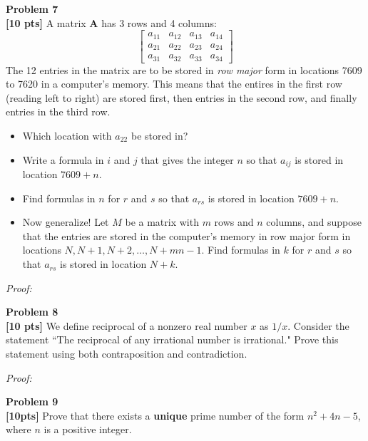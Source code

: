 \documentclass{article}
\newenvironment{problem}[2][Problem]
    { \begin{mdframed}[backgroundcolor=gray!20] \textbf{#1 #2} \\}
    {  \end{mdframed}}
\newenvironment{solution}
    {\textit{Proof:}}
    {}
\begin{document}
\begin{problem}{7}
\textbf{[10 pts]} A matrix $\textbf{A}$ has 3 rows and 4 columns:
\[
    \begin{bmatrix} 
        a_{11} & a_{12} & a_{13} & a_{14} \\
        a_{21} & a_{22} & a_{23} & a_{24} \\
        a_{31} & a_{32} & a_{33} & a_{34} 
    \end{bmatrix}
\]
The 12 entries in the matrix are to be stored in \textit{row major} form in locations 7609 to 7620 in a computer's memory. This means that the entires in the first row (reading left to right) are stored first, then entries in the second row, and finally entries in the third row.
\begin{itemize}
    \item Which location with $a_{22}$ be stored in?
    \item Write a formula in $i$ and $j$ that gives the integer $n$ so that $a_{ij}$ is stored in location $7609 + n$. 
    \item Find formulas in $n$ for $r$ and $s$ so that $a_{rs}$ is stored in location $7609 + n$.
    \item Now generalize! Let $M$ be a matrix with $m$ rows and $n$ columns, and suppose that the entries are stored in the computer's memory in row major form in locations $N, N+1, N+2, \ldots, N+mn-1$. Find formulas in $k$ for $r$ and $s$ so that $a_{rs}$ is stored in location $N+k$.
\end{itemize}
\end{problem}

\begin{solution}
\end{solution}

\newpage
\begin{problem}{8}
\textbf{[10 pts]} We define reciprocal of a nonzero real number $x$ as $1/x$. Consider the statement ``The reciprocal of any irrational number is irrational."  Prove this statement using both contraposition and contradiction.
\end{problem}
\begin{solution}
\end{solution}

\begin{problem}{9}
\textbf{[10pts]} Prove that there exists a \textbf{unique} prime number of the form $n^2 + 4n - 5$, where $n$ is a positive integer.
\end{problem}
\end{document}

